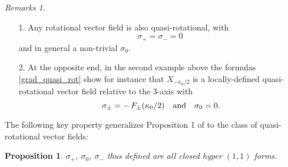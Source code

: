\documentclass[11pt]{amsart}
\newtheorem{proposition}[theorem]{Proposition}
\theoremstyle{remark}
\theoremstyle{remark}
\newtheorem*{remarks}{Remarks}
\theoremstyle{definition}
\theoremstyle{definition}
\theoremstyle{definition}
\newcommand{\0}{{\scriptstyle 0'}} %
\newcommand{\1}{{\scriptstyle 1'}}
\begin{document}
\begin{remarks} \hfill
\begin{itemize}
\setlength{\itemsep}{3pt}
\item[1.] Any rotational vector field is also quasi-rotational, with
\begin{equation}
\sigma_+ = \sigma_- = 0
\end{equation}
and in general a non-trivial $\sigma_0$.
\item[2.] At the opposite end, in the second example above the formulas \eqref{grad_quasi_rot} show for instance that $X_{-\kappa_0/2}$ is a locally-defined quasi-rotational vector field relative to the 3-axis with  
\begin{equation}
\sigma_{\pm} = - \, F_{\pm}(\kappa_0/2)
\quad\text{and}\quad
\sigma_0 = 0
\rlap{.}
\end{equation}
\end{itemize}
\end{remarks}
 
\medskip

\noindent The following key property generalizes Proposition 1 of \cite{MR3116317} to the class of quasi-rotational vector fields:

\begin{proposition} \label{quasi_rot_hyperpot}
$\sigma_+$, $\sigma_0$, $\sigma_-$ thus defined are all closed hyper $(1,1)$ forms.
\end{proposition}
\end{document}
